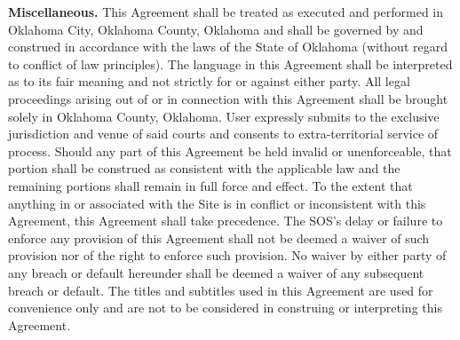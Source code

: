 \textbf{Miscellaneous.}
This Agreement shall be treated as executed and performed in Oklahoma City,
Oklahoma County, Oklahoma and shall be governed by and construed in accordance
with the laws of the State of Oklahoma (without regard to conflict of law
principles). The language in this Agreement shall be interpreted as to its fair
meaning and not strictly for or against either party. All legal proceedings
arising out of or in connection with this Agreement shall be brought solely in
Oklahoma County, Oklahoma. User expressly submits to the exclusive jurisdiction
and venue of said courts and consents to extra-territorial service of process.
Should any part of this Agreement be held invalid or unenforceable, that portion
shall be construed as consistent with the applicable law and the remaining
portions shall remain in full force and effect. To the extent that anything in
or associated with the Site is in conflict or inconsistent with this Agreement,
this Agreement shall take precedence. The SOS's delay or failure to enforce any
provision of this Agreement shall not be deemed a waiver of such provision nor
of the right to enforce such provision. No waiver by either party of any breach
or default hereunder shall be deemed a waiver of any subsequent breach or
default. The titles and subtitles used in this Agreement are used for
convenience only and are not to be considered in construing or interpreting this
Agreement.